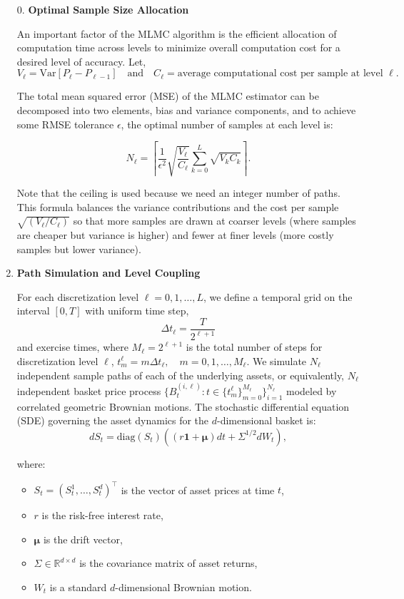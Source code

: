 \documentclass[titlepage]{article}
\begin{document}
\begin{enumerate}

    \item[0.] \textbf{Optimal Sample Size Allocation}

    An important factor of the MLMC algorithm is the efficient allocation of computation time across levels to minimize overall computation cost for a desired level of accuracy. Let,
    \[
    V_\ell = \mathrm{Var}[P_\ell - P_{\ell-1}] \quad \text{and} \quad C_\ell = \text{average computational cost per sample at level } \ell.
    \]

    The total mean squared error (MSE) of the MLMC estimator can be decomposed into two elements, bias and variance components, and to achieve some RMSE tolerance \(\epsilon\), the optimal number of samples at each level is:

    \[
    N_\ell = \left\lceil \frac{1}{\epsilon^2} \sqrt{\frac{V_\ell}{C_\ell}} \sum_{k=0}^L \sqrt{V_k C_k} \right\rceil.
    \]

    Note that the ceiling is used because we need an integer number of paths. This formula balances the variance contributions and the cost per sample \(\sqrt{(V_\ell / C_\ell)}\) so that more samples are drawn at coarser levels (where samples are cheaper but variance is higher) and fewer at finer levels (more costly samples but lower variance).

    \item \textbf{Path Simulation and Level Coupling}

    For each discretization level \(\ell = 0, 1, \dots, L\), we define a temporal grid on the interval \([0, T]\) with uniform time step,\[\Delta t_\ell = \frac{T}{2^{\ell+1}}\] and exercise times, where $M_\ell = 2^{\ell + 1}$ is the total number of steps for discretization level $\ell$, \(t_m^\ell = m \Delta t_\ell, \quad m = 0, 1, \dots, M_\ell\). We simulate \(N_\ell\) independent sample paths of each of the underlying assets, or equivalently, \(N_\ell\) independent basket price process \(\{B_t^{(i, \ell)} : t \in \{t_m^\ell\}_{m=0}^{M_\ell}\}_{i=1}^{N_\ell}\)  modeled by correlated geometric Brownian motions. The stochastic differential equation (SDE) governing the asset dynamics for the \(d\)-dimensional basket is:
    \[
    dS_t = \mathrm{diag}(S_t) \left( (r \mathbf{1} + \boldsymbol{\mu}) dt + \Sigma^{1/2} dW_t \right),
    \]

    where:
    \begin{itemize}
        \item \(S_t = (S_t^1, \dots, S_t^d)^\top\) is the vector of asset prices at time \(t\),
        \item \(r\) is the risk-free interest rate,
        \item \(\boldsymbol{\mu}\) is the drift vector,
        \item \(\Sigma \in \mathbb{R}^{d \times d}\) is the covariance matrix of asset returns,
        \item \(W_t\) is a standard \(d\)-dimensional Brownian motion.
    \end{itemize}


\end{enumerate}
\end{document}
